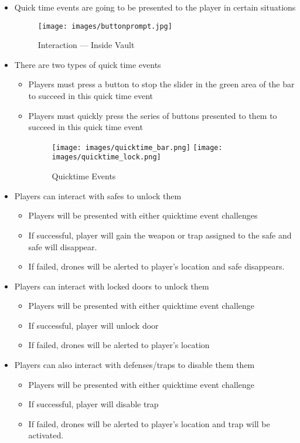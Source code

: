 \documentclass[10pt]{report}
\begin{document}
\begin{itemize}
    \item Quick time events are going to be presented to the player in certain situations
    \begin{figure}[H]
        \centering
        \texttt{[image: images/buttonprompt.jpg]}
        \caption{Interaction --- Inside Vault}
    \end{figure}
    \item There are two types of quick time events
    \begin{itemize}
        \item Players must press a button to stop the slider in the green area of the bar to  succeed in this quick time event 
        \item Players must quickly press the series of buttons presented to them to succeed in this quick time event
        \begin{figure}[H]
            \centering
            \texttt{[image: images/quicktime\_bar.png]}
            \texttt{[image: images/quicktime\_lock.png]}
            \caption{Quicktime Events}
        \end{figure}
    \end{itemize}
    \item Players can interact with safes to unlock them
    \begin{itemize}
        \item Players will be presented with either quicktime event challenges
        \item If successful, player will gain the weapon or trap assigned to the safe and safe will disappear.
        \item If failed, drones will be alerted to player’s location and safe disappears.
    \end{itemize}
    \item Players can interact with locked doors to unlock them
    \begin{itemize}
        \item Players will be presented with either quicktime event challenge
        \item If successful, player will unlock door 
        \item If failed, drones will be alerted to player’s location
    \end{itemize}
    \item Players can also interact with defenses/traps to disable them them
    \begin{itemize}
        \item Players will be presented with either quicktime event challenge
        \item If successful, player will disable trap 
        \item If failed, drones will be alerted to player’s location and trap will be activated.
    \end{itemize}
\end{itemize}
\end{document}
